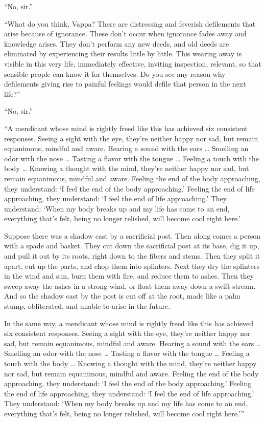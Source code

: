\documentclass[12pt,openany]{book}%
\begin{document}
“No, sir.” 

“What do you think, Vappa? There are distressing and feverish defilements that arise because of ignorance. These don’t occur when ignorance fades away and knowledge arises. They don’t perform any new deeds, and old deeds are eliminated by experiencing their results little by little. This wearing away is visible in this very life, immediately effective, inviting inspection, relevant, so that sensible people can know it for themselves. Do you see any reason why defilements giving rise to painful feelings would defile that person in the next life?” 

“No, sir.” 

“A mendicant whose mind is rightly freed like this has achieved six consistent responses. Seeing a sight with the eye, they’re neither happy nor sad, but remain equanimous, mindful and aware. Hearing a sound with the ears … Smelling an odor with the nose … Tasting a flavor with the tongue … Feeling a touch with the body … Knowing a thought with the mind, they’re neither happy nor sad, but remain equanimous, mindful and aware. Feeling the end of the body approaching, they understand: ‘I feel the end of the body approaching.’ Feeling the end of life approaching, they understand: ‘I feel the end of life approaching.’ They understand: ‘When my body breaks up and my life has come to an end, everything that’s felt, being no longer relished, will become cool right here.’ 

Suppose there was a shadow cast by a sacrificial post. Then along comes a person with a spade and basket. They cut down the sacrificial post at its base, dig it up, and pull it out by its roots, right down to the fibers and stems. Then they split it apart, cut up the parts, and chop them into splinters. Next they dry the splinters in the wind and sun, burn them with fire, and reduce them to ashes. Then they sweep away the ashes in a strong wind, or float them away down a swift stream. And so the shadow cast by the post is cut off at the root, made like a palm stump, obliterated, and unable to arise in the future. 

In the same way, a mendicant whose mind is rightly freed like this has achieved six consistent responses. Seeing a sight with the eye, they’re neither happy nor sad, but remain equanimous, mindful and aware. Hearing a sound with the ears … Smelling an odor with the nose … Tasting a flavor with the tongue … Feeling a touch with the body … Knowing a thought with the mind, they’re neither happy nor sad, but remain equanimous, mindful and aware. Feeling the end of the body approaching, they understand: ‘I feel the end of the body approaching.’ Feeling the end of life approaching, they understand: ‘I feel the end of life approaching.’ They understand: ‘When my body breaks up and my life has come to an end, everything that’s felt, being no longer relished, will become cool right here.’” 
\end{document}
